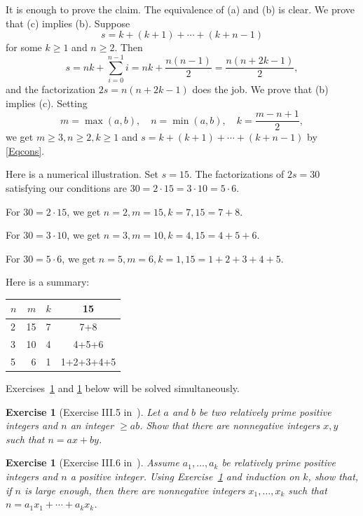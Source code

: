 \documentclass[12pt,letterpaper]{article}
\newtheorem{exer}[thm]{Exercise}
\theoremstyle{definition}
\begin{document}
It is enough to prove the claim. The equivalence of (a) and (b) is clear. We prove that (c) implies (b). Suppose 
$$
s=k+(k+1)+\cdots+(k+n-1)
$$ 
for some $k\ge1$ and $n\ge2$. Then
\begin{equation}\label{Eqcons}
s=nk+\sum_{i=0}^{n-1}i=nk+\frac{n(n-1)}{2}=\frac{n(n+2k-1)}{2},
\end{equation} 
and the factorization $2s=n(n+2k-1)$ does the job. We prove that (b) implies (c). Setting 
$$
m=\max(a,b),\quad n=\min(a,b),\quad k=\frac{m-n+1}{2},
$$ 
we get $m\ge3,n\ge2,k\ge1$ and $s=k+(k+1)+\cdots+(k+n-1)$ by \eqref{Eqcons}. 

Here is a numerical illustration. Set $s=15$. The factorizations of $2s=30$ satisfying our conditions are $30 = 2 \cdot 15 = 3 \cdot 10 = 5 \cdot 6$. 

For $30 = 2 \cdot 15$, we get $n=2, m=15, k=7, 15=7+8$. 

For $30 = 3 \cdot 10$, we get $n=3, m=10, k=4, 15=4+5+6$. 

For $30 = 5 \cdot 6$, we get $n=5, m=6, k=1, 15=1+2+3+4+5$. 

Here is a summary: 
\begin{table}[htbp]
    \centering
    \begin{tabular}{| l | r | l | c |}
    \hline
    $n$ & $m$ & $k$ & 15 \\ \hline
    2 & 15 & 7 & 7+8 \\ \hline
    3 & 10 & 4 & 4+5+6 \\ \hline
    5 &  6 & 1 & 1+2+3+4+5 \\ \hline
    \end{tabular}
\end{table}

Exercises~\ref{ExIII5} and \ref{ExIII6} below will be solved simultaneously. 

\begin{exer}[Exercise III.5 in~\cite{weil1979}]\label{ExIII5} 
Let $a$ and $b$ be two relatively prime positive integers and $n$ an integer $\ge ab$. Show that there are nonnegative integers $x,y$ such that $n=ax+by$. 
\end{exer} 

\begin{exer}[Exercise III.6 in~\cite{weil1979}]\label{ExIII6} 
Assume $a_1,\ldots,a_k$ be relatively prime positive integers and $n$ a positive integer. Using Exercise~\ref{ExIII5} and induction on $k$, show that, if $n$ is large enough, then there are nonnegative integers $x_1,\ldots,x_k$ such that $n=a_1x_1+\cdots+a_kx_k$. 
\end{exer} 
\end{document}
